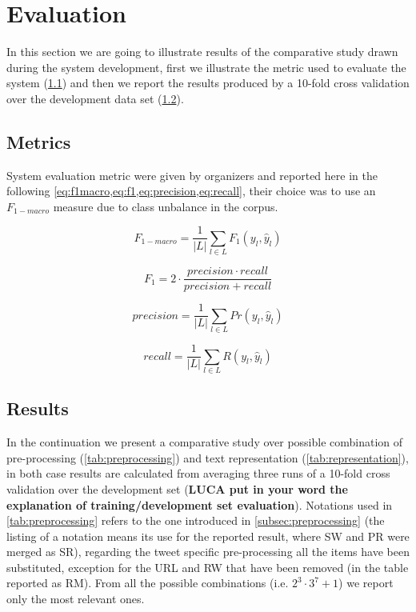 \section{Evaluation} \label{sec:evaluation}

In this section we are going to illustrate results of the comparative study drawn during the system development, first we illustrate the metric used to evaluate the system (\cref{subsec:metric}) and then we report the results produced by a 10-fold cross validation over the development data set (\cref{subsec:results}).

\subsection{Metrics} \label{subsec:metric}

System evaluation metric were given by organizers and reported here in the following \cref{eq:f1macro,eq:f1,eq:precision,eq:recall}, their choice was to use an $F_{1-macro}$ measure due to class unbalance in the corpus.

\begin{multicols}{2}
\begin{equation} \label{eq:f1macro}
F_{1-macro} = \frac{1}{|L|} \displaystyle\sum_{l\in L} F_1(y_l, \hat{y}_l)
\end{equation}

\begin{equation} \label{eq:f1}
F_1 = 2 \cdot \frac{precision \cdot recall }{precision + recall}
\end{equation}

\begin{equation} \label{eq:precision}
precision = \frac{1}{|L|} \displaystyle\sum_{l\in L} Pr(y_l, \hat{y}_l)
\end{equation}

\begin{equation} \label{eq:recall}
recall = \frac{1}{|L|} \displaystyle\sum_{l\in L} R(y_l, \hat{y}_l)
\end{equation}
\end{multicols}



\subsection{Results} \label{subsec:results}

In the continuation we present a comparative study over possible combination of pre-processing (\cref{tab:preprocessing}) and text representation (\cref{tab:representation}), in both case results are calculated from averaging three runs of a 10-fold cross validation over the development set (\textbf{LUCA put in your word the explanation of training/development set evaluation}).
Notations used in \cref{tab:preprocessing} refers to the one introduced in \cref{subsec:preprocessing} (the listing of a notation means its use for the reported result, where SW and PR were merged as SR), regarding the tweet specific pre-processing all the items have been substituted, exception for the URL and RW that have been removed (in the table reported as RM). From all the possible combinations (i.e. $2^3\cdot3^{7}+1$) we report only the most relevant ones.

